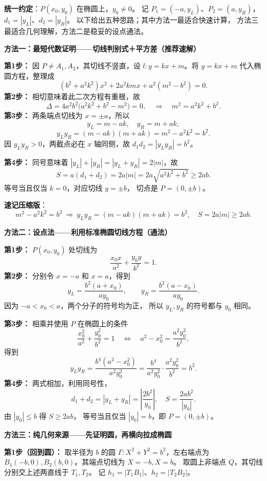 \begin{proofbox}
\textbf{统一约定}：$P(x_0,y_0)$ 在椭圆上，$y_0\ne0$。
记 $P_1=(-a,y_L)$、$P_2=(a,y_R)$，
$d_1=|y_L|$、$d_2=|y_R|$。
以下给出五种思路；其中方法一最适合快速计算，
方法三最适合几何理解，方法二是稳妥的设点通法。

\medskip
\textbf{方法一：最短代数证明——切线判别式＋平方差（推荐速解）}

\textbf{第1步：} 因 $P\ne A_1,A_2$，其切线不竖直，设
$l:y=kx+m$。将 $y=kx+m$ 代入椭圆方程，整理成
\[
(b^2+a^2k^2)x^2+2a^2kmx+a^2(m^2-b^2)=0.
\]
\textbf{第2步：} 相切意味着此二次方程有重根，故
\[
\Delta=4a^2b^2\bigl(a^2k^2+b^2-m^2\bigr)=0,
\quad\Longrightarrow\quad m^2=a^2k^2+b^2.
\]
\textbf{第3步：} 两条端点切线为 $x=\pm a$，所以
\[
y_L=m-ak,\quad y_R=m+ak,
\]
\[
\boxed{y_Ly_R=(m-ak)(m+ak)=m^2-a^2k^2=b^2.}
\]
因 $y_Ly_R>0$，两截点必在 $x$ 轴同侧，故
$d_1d_2=|y_Ly_R|=b^2$。

\textbf{第4步：} 同号意味着 $|y_L|+|y_R|=|y_L+y_R|=2|m|$，故
\[
S=a(d_1+d_2)=2a|m|
=2a\sqrt{a^2k^2+b^2}\ge2ab.
\]
等号当且仅当 $k=0$，对应切线 $y=\pm b$，
切点是 $P=(0,\pm b)$。

\textbf{速记压缩版}：
\[
\boxed{m^2-a^2k^2=b^2}
\ \Longrightarrow\ 
\boxed{y_Ly_R=(m-ak)(m+ak)=b^2},
\quad\boxed{S=2a|m|\ge2ab}.
\]

\medskip
\textbf{方法二：设点法——利用标准椭圆切线方程（通法）}

\textbf{第1步：} $P(x_0,y_0)$ 处切线为
\[
\frac{x_0x}{a^2}+\frac{y_0y}{b^2}=1.
\]
\textbf{第2步：} 分别令 $x=-a$ 和 $x=a$，得到
\[
y_L=\frac{b^2(a+x_0)}{ay_0},\qquad
 y_R=\frac{b^2(a-x_0)}{ay_0}.
\]
因为 $-a<x_0<a$，两个分子的符号均为正，
所以 $y_L,y_R$ 的符号都与 $y_0$ 相同。

\textbf{第3步：} 相乘并使用 $P$ 在椭圆上的条件
\[
\frac{x_0^2}{a^2}+\frac{y_0^2}{b^2}=1
\quad\Longleftrightarrow\quad
 a^2-x_0^2=\frac{a^2y_0^2}{b^2},
\]
得到
\[
y_Ly_R=\frac{b^4(a^2-x_0^2)}{a^2y_0^2}
=\frac{b^4}{a^2y_0^2}\cdot\frac{a^2y_0^2}{b^2}=b^2.
\]
\textbf{第4步：} 两式相加，利用同号性，
\[
d_1+d_2=|y_L+y_R|
=\left|\frac{2b^2}{y_0}\right|,
\quad S=\frac{2ab^2}{|y_0|}.
\]
由 $|y_0|\le b$ 得 $S\ge2ab$，
等号当且仅当 $|y_0|=b$，即 $P=(0,\pm b)$。

\medskip
\textbf{方法三：纯几何来源——先证明圆，再横向拉成椭圆}

\textbf{第1步（回到圆）：} 取半径为 $b$ 的圆
$\Gamma:X^2+Y^2=b^2$，左右端点为
$B_1(-b,0),B_2(b,0)$。其端点切线为 $X=-b,X=b$。
取圆上非端点 $Q$，其切线分别交上述两直线于 $T_1,T_2$。
记 $h_1=|T_1B_1|$、$h_2=|T_2B_2|$。


\end{proofbox}

